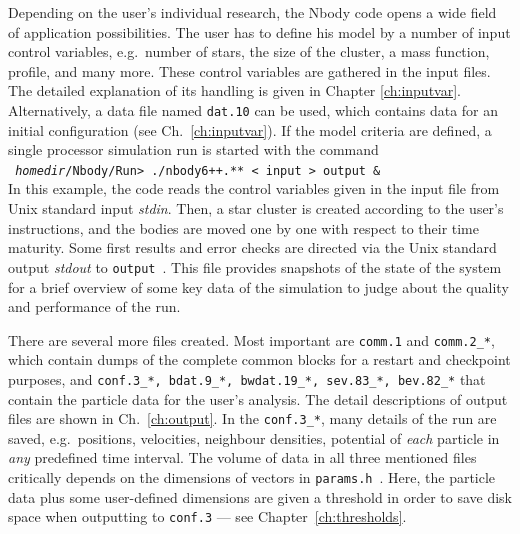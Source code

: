 Depending on the user's individual research, the Nbody code opens
a wide field of application possibilities.
The user has to define his model by a number of input control variables,
e.g.\ number of stars, the size of the cluster, a mass function,
profile, and many more.
These control variables are gathered in the input files.
The detailed explanation of its handling is given in Chapter
\ref{ch:inputvar}.
Alternatively, a data file named {\tt dat.10} can be used, which
contains data for an initial configuration (see Ch.~\ref{ch:inputvar}).
%
If the model criteria are defined, a single processor
simulation run is started with the command \\

\noindent
{\tt
  {\it homedir}/Nbody/Run> ./nbody6++.** < input > output \&
}\\

In this example, the code reads the control variables given
in the input file from Unix standard input {\it stdin}.
Then, a star cluster is created according to the user's
instructions, and the bodies are moved one by one with respect
to their time maturity.
Some first results and error checks are directed via the Unix standard
output {\it stdout} to {\tt output}~.
This file provides snapshots of the state of the system for a
brief overview of some key data of the simulation to judge
about the quality and performance of the run.

There are several more files created. %
Most important are {\tt comm.1} and {\tt comm.2\_*}, which contain
dumps of the complete common blocks for a restart and checkpoint 
purposes, and {\tt conf.3\_*, bdat.9\_*, bwdat.19\_*, sev.83\_*, bev.82\_*} that contain the particle data for the user's analysis. 
The detail descriptions of output files are shown in Ch.~\ref{ch:output}.
In the {\tt conf.3\_*}, many details of the run are saved, e.g.\ positions,
velocities, neighbour densities, potential of {\it each} particle
in {\it any} predefined time interval.
The volume of data in all three mentioned files critically depends
on the dimensions of vectors in {\tt params.h}~.
Here, the particle data plus some user-defined dimensions are
given a threshold in order to save disk space when outputting to
{\tt conf.3} --- see Chapter~\ref{ch:thresholds}.

